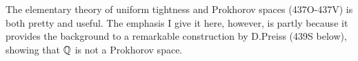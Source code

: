 {The elementary theory of uniform tightness and Prokhorov spaces
(437O-437V) %
is both pretty and useful.   The emphasis I give it here, however, is
partly because it provides the background to a remarkable construction
by D.Preiss (439S below), showing that $\Bbb Q$ is not a Prokhorov
space.
}%

\discrpage

